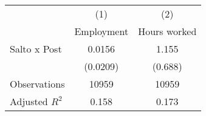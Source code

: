 {
\def\sym#1{\ifmmode^{#1}\else\(^{#1}\)\fi}
\begin{tabular}{l*{2}{c}}
\hline\hline
                &\multicolumn{1}{c}{(1)}&\multicolumn{1}{c}{(2)}\\
                &\multicolumn{1}{c}{Employment}&\multicolumn{1}{c}{Hours worked}\\
\hline
Salto x Post    &   0.0156         &    1.155         \\
                & (0.0209)         &  (0.688)         \\
\hline
Observations    &    10959         &    10959         \\
Adjusted \(R^{2}\)&    0.158         &    0.173         \\
\hline\hline
\end{tabular}
}
